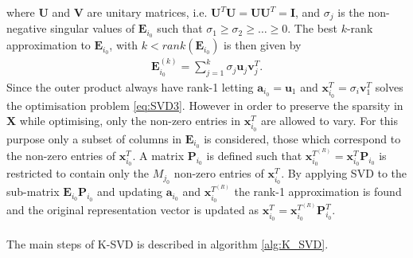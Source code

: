 where $\textbf{U}$ and $\textbf{V}$ are unitary matrices, i.e. $\textbf{U}^T\textbf{U}=\textbf{UU}^T=\textbf{I}$, and $\sigma_j$ is the non-negative singular values of $\textbf{E}_{i_0}$ such that $\sigma_1\geq \sigma_2 \geq \hdots \geq 0$. The best $k$-rank approximation to $\textbf{E}_{i_0}$, with $k< rank(\textbf{E}_{i_0})$ is then given by\cite{Wiki..} 
\begin{align*}
\textbf{E}_{i_{0}}^{(k)}= \sum_{j=1}^{k}\sigma_j\textbf{u}_{j}\textbf{v}_{j}^T.
\end{align*} 
Since the outer product always have rank-1 letting $\textbf{a}_{i_0}=\textbf{u}_1$ and $\textbf{x}_{i_0}^T = \sigma_{i}\textbf{v}_{1}^T$ solves the optimisation problem \eqref{eq:SVD3}.
However in order to preserve the sparsity in $\textbf{X}$ while optimising, only the non-zero entries in $\textbf{x}_{i_0}^T$ are allowed to vary. For this purpose only a subset of columns in $\textbf{E}_{i_0}$ is considered, those which correspond to the non-zero entries of $\textbf{x}_{i_0}^T$. A matrix $\textbf{P}_{i_0}$ is defined such that $\textbf{x}_{i_0}^{T^{(R)}}=\textbf{x}_{i_0}^T\textbf{P}_{i_0} $ is restricted to contain only the $M_{j_0}$ non-zero entries of $\textbf{x}_{i_0}^T$. By applying SVD to the  sub-matrix $\textbf{E}_{i_0}\textbf{P}_{i_0}$ and updating $\textbf{a}_{i_0}$ and $\textbf{x}_{i_0}^{T^{(R)}}$ the rank-1 approximation is found and the original representation vector is updated as $\textbf{x}_{i_0}^{T}=\textbf{x}_{i_0}^{T^{(R)}}\textbf{P}_{i_0}^{T}$.  \\ \\
The main steps of K-SVD is described in algorithm \ref{alg:K_SVD}. 

